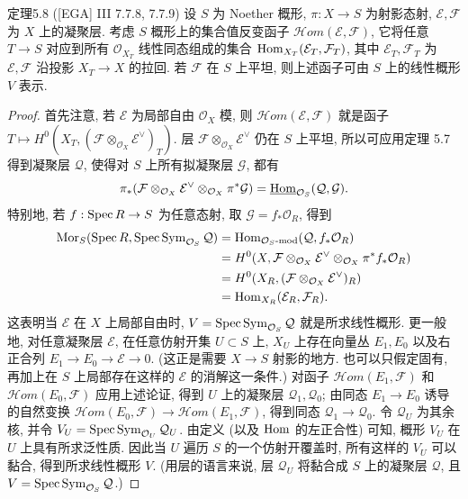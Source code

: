 \begin{origstatement}{定理}{5.8}\label{ch05:thm5.8}
([EGA] III 7.7.8, 7.7.9) 设 $S$ 为 Noether 概形, $\pi:X\to S$ 为射影态射, $\mathcal E,\mathcal F$ 为 $X$ 上的凝聚层. 考虑 $S$ 概形上的集合值反变函子 $\mathcal{H}om(\mathcal E,\mathcal F)$, 它将任意 $T\to S$ 对应到所有 $\mathcal O_{X_T}$ 线性同态组成的集合 $\operatorname{Hom}_{X_T}(\mathcal E_T,\mathcal F_T)$, 其中 $\mathcal E_T,\mathcal F_T$ 为 $\mathcal E,\mathcal F$ 沿投影 $X_T\to X$ 的拉回. 若 $\mathcal F$ 在 $S$ 上平坦, 则上述函子可由 $S$ 上的线性概形 $V$ 表示.
\end{origstatement}
\begin{proof}
首先注意, 若 $\mathcal E$ 为局部自由 $\mathcal O_X$ 模, 则 $\mathcal{H}om(\mathcal E,\mathcal F)$ 就是函子 $T\mapsto H^0(X_T,(\mathcal F\otimes_{\mathcal O_X}\mathcal E^\vee)_T)$. 层 $\mathcal F\otimes_{\mathcal O_X}\mathcal E^\vee$ 仍在 $S$ 上平坦, 所以可应用定理 5.7 得到凝聚层 $\mathcal Q$, 使得对 $S$ 上所有拟凝聚层 $\mathcal G$, 都有
\[
 \pi_*(\mathcal F\otimes_{\mathcal O_X}\mathcal E^\vee\otimes_{\mathcal O_X}\pi^*\mathcal G)
 =\underline{\operatorname{Hom}}_{\mathcal O_S}(\mathcal Q,\mathcal G).
\]
特别地, 若 $f:\operatorname{Spec} R\to S$ 为任意态射, 取 $\mathcal G=f_*\mathcal O_R$, 得到
\[
\begin{aligned}
 \operatorname{Mor}_S(\operatorname{Spec} R,\operatorname{Spec}\operatorname{Sym}_{\mathcal O_S}\mathcal Q)
 &=\operatorname{Hom}_{\mathcal O_S\text{-}\mathrm{mod}}(\mathcal Q,f_*\mathcal O_R)\\
 &=H^0(X,\mathcal F\otimes_{\mathcal O_X}\mathcal E^\vee\otimes_{\mathcal O_X}\pi^*f_*\mathcal O_R)\\
 &=H^0(X_R,(\mathcal F\otimes_{\mathcal O_X}\mathcal E^\vee)_R)\\
 &=\operatorname{Hom}_{X_R}(\mathcal E_R,\mathcal F_R).
\end{aligned}
\]
这表明当 $\mathcal E$ 在 $X$ 上局部自由时, $V=\operatorname{Spec}\operatorname{Sym}_{\mathcal O_S}\mathcal Q$ 就是所求线性概形. 更一般地, 对任意凝聚层 $\mathcal E$, 在任意仿射开集 $U\subset S$ 上, $X_U$ 上存在向量丛 $E_1,E_0$ 以及右正合列 $E_1\to E_0\to\mathcal E\to0$. (这正是需要 $X\to S$ 射影的地方. 也可以只假定固有, 再加上在 $S$ 上局部存在这样的 $\mathcal E$ 的消解这一条件.) 对函子 $\mathcal{H}om(E_1,\mathcal F)$ 和 $\mathcal{H}om(E_0,\mathcal F)$ 应用上述论证, 得到 $U$ 上的凝聚层 $\mathcal Q_1,\mathcal Q_0$; 由同态 $E_1\to E_0$ 诱导的自然变换 $\mathcal{H}om(E_0,\mathcal F)\to\mathcal{H}om(E_1,\mathcal F)$, 得到同态 $\mathcal Q_1\to\mathcal Q_0$. 令 $\mathcal Q_U$ 为其余核, 并令 $V_U=\operatorname{Spec}\operatorname{Sym}_{\mathcal O_U}\mathcal Q_U$. 由定义 (以及 $\operatorname{Hom}$ 的左正合性) 可知, 概形 $V_U$ 在 $U$ 上具有所求泛性质. 因此当 $U$ 遍历 $S$ 的一个仿射开覆盖时, 所有这样的 $V_U$ 可以黏合, 得到所求线性概形 $V$. (用层的语言来说, 层 $\mathcal Q_U$ 将黏合成 $S$ 上的凝聚层 $\mathcal Q$, 且 $V=\operatorname{Spec}\operatorname{Sym}_{\mathcal O_S}\mathcal Q$.)
\end{proof}

